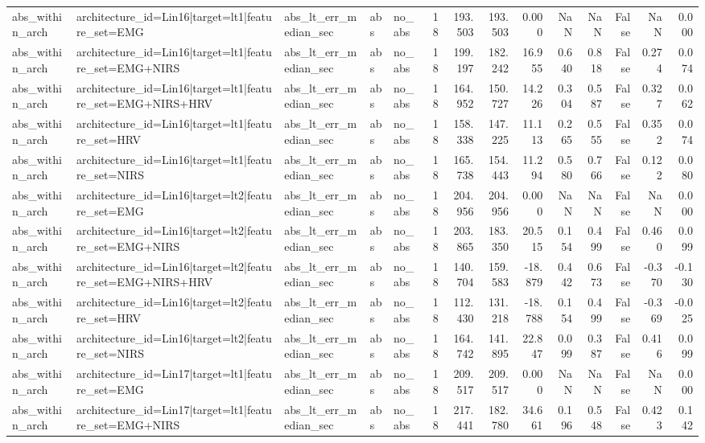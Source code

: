 \begin{table}
\begin{tabular}{lllllrrrrrrrrr}
abs_within_arch & architecture_id=Lin16|target=lt1|feature_set=EMG & abs_lt_err_median_sec & abs & no_abs & 18 & 193.503 & 193.503 & 0.000 & NaN & NaN & False & NaN & 0.000 \\
abs_within_arch & architecture_id=Lin16|target=lt1|feature_set=EMG+NIRS & abs_lt_err_median_sec & abs & no_abs & 18 & 199.197 & 182.242 & 16.955 & 0.640 & 0.818 & False & 0.274 & 0.074 \\
abs_within_arch & architecture_id=Lin16|target=lt1|feature_set=EMG+NIRS+HRV & abs_lt_err_median_sec & abs & no_abs & 18 & 164.952 & 150.727 & 14.226 & 0.304 & 0.587 & False & 0.327 & 0.062 \\
abs_within_arch & architecture_id=Lin16|target=lt1|feature_set=HRV & abs_lt_err_median_sec & abs & no_abs & 18 & 158.338 & 147.225 & 11.113 & 0.265 & 0.555 & False & 0.352 & 0.074 \\
abs_within_arch & architecture_id=Lin16|target=lt1|feature_set=NIRS & abs_lt_err_median_sec & abs & no_abs & 18 & 165.738 & 154.443 & 11.294 & 0.580 & 0.766 & False & 0.122 & 0.080 \\
abs_within_arch & architecture_id=Lin16|target=lt2|feature_set=EMG & abs_lt_err_median_sec & abs & no_abs & 18 & 204.956 & 204.956 & 0.000 & NaN & NaN & False & NaN & 0.000 \\
abs_within_arch & architecture_id=Lin16|target=lt2|feature_set=EMG+NIRS & abs_lt_err_median_sec & abs & no_abs & 18 & 203.865 & 183.350 & 20.515 & 0.154 & 0.499 & False & 0.460 & 0.099 \\
abs_within_arch & architecture_id=Lin16|target=lt2|feature_set=EMG+NIRS+HRV & abs_lt_err_median_sec & abs & no_abs & 18 & 140.704 & 159.583 & -18.879 & 0.442 & 0.673 & False & -0.370 & -0.130 \\
abs_within_arch & architecture_id=Lin16|target=lt2|feature_set=HRV & abs_lt_err_median_sec & abs & no_abs & 18 & 112.430 & 131.218 & -18.788 & 0.154 & 0.499 & False & -0.369 & -0.025 \\
abs_within_arch & architecture_id=Lin16|target=lt2|feature_set=NIRS & abs_lt_err_median_sec & abs & no_abs & 18 & 164.742 & 141.895 & 22.847 & 0.099 & 0.387 & False & 0.416 & 0.099 \\
abs_within_arch & architecture_id=Lin17|target=lt1|feature_set=EMG & abs_lt_err_median_sec & abs & no_abs & 18 & 209.517 & 209.517 & 0.000 & NaN & NaN & False & NaN & 0.000 \\
abs_within_arch & architecture_id=Lin17|target=lt1|feature_set=EMG+NIRS & abs_lt_err_median_sec & abs & no_abs & 18 & 217.441 & 182.780 & 34.661 & 0.196 & 0.548 & False & 0.423 & 0.142 \\

\end{tabular}
\end{table}

